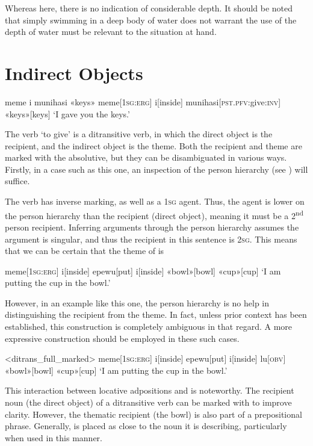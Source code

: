 Whereas here, there is no indication of considerable depth. It should be noted that simply swimming in a deep body of water does not warrant the use of  the depth of water must be relevant to the situation at hand.

\section{Indirect Objects}
\ex
\begingl
\glpreamble meme i munihasi «keys»
\endpreamble
meme[\textsc{1sg:erg}]
i[inside]
munihasi[\textsc{pst.pfv:}give\textsc{:inv}]
«keys»[keys]
\glft `I gave you the keys.'
\endgl
\xe

The verb  `to give' is a ditransitive verb, in which the direct object is the recipient, and the indirect object is the theme. Both the recipient and theme are marked with the absolutive, but they can be disambiguated in various ways. Firstly, in a case such as this one, an inspection of the person hierarchy (see ) will suffice.

The verb  has inverse marking, as well as a \textsc{1sg} agent. Thus, the agent is lower on the person hierarchy than the recipient (direct object), meaning it must be a 2\textsuperscript{nd} person recipient. Inferring arguments through the person hierarchy assumes the argument is singular, and thus the recipient in this sentence is \textsc{2sg}. This means that we can be certain that the theme of  is 

\ex
\begingl
\glpreamble
\pronounced{}\endpreamble
meme[\textsc{1sg:erg}]
i[inside]
epewu[put]
i[inside]
«bowl»[bowl]
«cup»[cup]
\glft `I am putting the cup in the bowl.'
\endgl
\xe

However, in an example like this one, the person hierarchy is no help in distinguishing the recipient from the theme. In fact, unless prior context has been established, this construction is completely ambiguous in that regard. A more expressive construction should be employed in these such cases.

\ex<ditrans_full_marked>
\begingl
\glpreamble
\pronounced{}\endpreamble
meme[\textsc{1sg:erg}]
i[inside]
epewu[put]
i[inside]
lu[\textsc{obv}]
«bowl»[bowl]
«cup»[cup]
\glft `I am putting the cup in the bowl.'
\endgl
\xe

This interaction between locative adpositions and  is noteworthy. The recipient noun (the direct object) of a ditransitive verb can be marked with  to improve clarity. However, the thematic recipient (the bowl) is also part of a prepositional phrase. Generally,  is placed as close to the noun it is describing, particularly when used in this manner.

